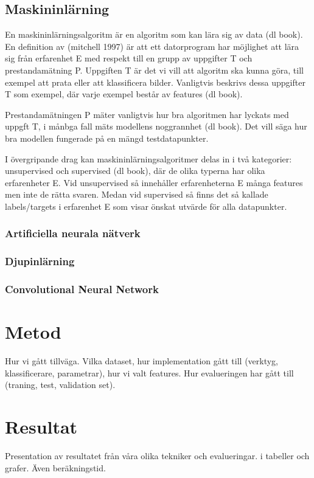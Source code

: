 \documentclass{kththesis}
\begin{document}
  \section{Maskininlärning}
  En maskininlärningsalgoritm är en algoritm som kan lära sig av data (dl book). En definition av (mitchell 1997) är att ett datorprogram har möjlighet att lära sig från erfarenhet E med respekt till en grupp av uppgifter T och prestandamätning P. Uppgiften T är det vi vill att algoritm ska kunna göra, till exempel att prata eller att klassificera bilder. Vanligtvis beskrivs dessa uppgifter T som exempel, där varje exempel består av features (dl book).

  Prestandamätningen P mäter vanligtvis hur bra algoritmen har lyckats med uppgft T, i månbga fall mäts modellens noggrannhet (dl book). Det vill säga hur bra modellen fungerade på en mängd testdatapunkter. 

  I övergripande drag kan maskininlärningsalgoritmer delas in i två kategorier: unsupervised och supervised (dl book), där de olika typerna har olika erfarenheter E. Vid unsupervised så innehåller erfarenheterna E många features men inte de rätta svaren. Medan vid supervised så finns det så kallade labels/targets i erfarenhet E som visar önskat utvärde för alla datapunkter.

    \subsection{Artificiella neurala nätverk}


    \subsection{Djupinlärning}

    \subsection{Convolutional Neural Network}

\chapter{Metod}
Hur vi gått tillväga. Vilka dataset, hur implementation gått till (verktyg, klassificerare, parametrar), hur vi valt features.
Hur evalueringen har gått till (traning, test, validation set).

\chapter{Resultat}
Presentation av resultatet från våra olika tekniker och evalueringar. i tabeller och grafer. Även beräkningstid. 
\end{document}
